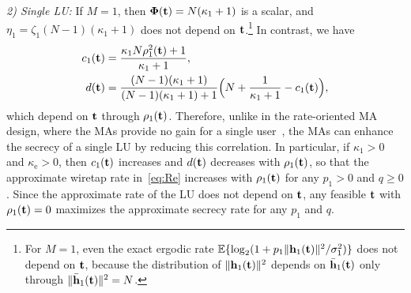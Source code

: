 \documentclass[journal]{IEEEtran}
\newcommand{\rev}[1]{{\color{red}#1}}
\newcommand{\rev}[1]{#1}
\begin{document}
\textit{2) Single LU:} If $M=1$, then $\boldsymbol{\Phi}(\mathbf{t})=N(\kappa_1+1)$ is a scalar, and $\eta_1=\zeta_1(N-1)(\kappa_1+1)$ does not depend on $\mathbf{t}$.\footnote{For $M=1$, even the exact ergodic rate $\mathbb{E}\{\log_2(1+p_1\|\mathbf{h}_1(\mathbf{t})\|^2/\sigma_1^2)\}$ does not depend on $\mathbf{t}$, because the distribution of $\|\mathbf{h}_1(\mathbf{t})\|^2$ depends on $\bar{\mathbf{h}}_1(\mathbf{t})$ only through $\|\bar{\mathbf{h}}_1(\mathbf{t})\|^2=N$.} In contrast, we have
\begin{align}
c_1(\mathbf{t})&=\frac{\kappa_1N\rho_1^2(\mathbf{t})+1}{\kappa_1+1},\label{eq:c1}\\
d(\mathbf{t})&=\frac{(N-1)(\kappa_1+1)}{(N-1)(\kappa_1+1)+1}\Big(N+\frac{1}{\kappa_1+1}-c_1(\mathbf{t})\Big),\label{eq:d1}
\end{align}
which depend on $\mathbf{t}$ through $\rho_1(\mathbf{t})$. Therefore, unlike in the rate-oriented MA design, where the MAs provide no gain for a single user~\cite[Remark~2]{ZhengTCOM2025}, the MAs can enhance the secrecy of a single LU by reducing this correlation. In particular, \rev{if $\kappa_1>0$ and $\kappa_{\mathrm e}>0$, then} $c_1(\mathbf{t})$ increases and $d(\mathbf{t})$ decreases with $\rho_1(\mathbf{t})$, so that the approximate wiretap rate in~\eqref{eq:Re} increases with $\rho_1(\mathbf{t})$ for any $p_1>0$ and $q\ge0$. Since the approximate rate of the LU does not depend on $\mathbf{t}$, any feasible $\mathbf{t}$ with $\rho_1(\mathbf{t})=0$ maximizes the approximate secrecy rate for any $p_1$ and $q$.
\end{document}
